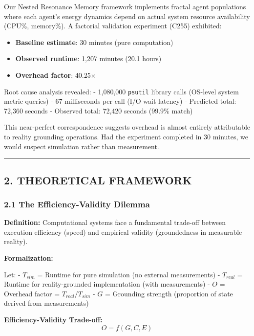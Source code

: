 \documentclass[
]{article}
\providecommand{\tightlist}{%
  \setlength{\itemsep}{0pt}\setlength{\parskip}{0pt}}
\begin{document}
Our Nested Resonance Memory framework implements fractal agent
populations where each agent's energy dynamics depend on actual system
resource availability (CPU\%, memory\%). A factorial validation
experiment (C255) exhibited:

\begin{itemize}
\tightlist
\item
  \textbf{Baseline estimate}: 30 minutes (pure computation)
\item
  \textbf{Observed runtime}: 1,207 minutes (20.1 hours)
\item
  \textbf{Overhead factor}: 40.25×
\end{itemize}

Root cause analysis revealed: - 1,080,000 \texttt{psutil} library calls
(OS-level system metric queries) - 67 milliseconds per call (I/O wait
latency) - Predicted total: 72,360 seconds - Observed total: 72,420
seconds (99.9\% match)

This near-perfect correspondence suggests overhead is almost entirely
attributable to reality grounding operations. Had the experiment
completed in 30 minutes, we would suspect simulation rather than
measurement.

\begin{center}\rule{0.5\linewidth}{0.5pt}\end{center}

\subsection{2. THEORETICAL FRAMEWORK}\label{theoretical-framework}

\subsubsection{2.1 The Efficiency-Validity
Dilemma}\label{the-efficiency-validity-dilemma}

\textbf{Definition:} Computational systems face a fundamental trade-off
between execution efficiency (speed) and empirical validity
(groundedness in measurable reality).

\textbf{Formalization:}

Let: - \(T_{sim}\) = Runtime for pure simulation (no external
measurements) - \(T_{real}\) = Runtime for reality-grounded
implementation (with measurements) - \(O\) = Overhead factor =
\(T_{real} / T_{sim}\) - \(G\) = Grounding strength (proportion of state
derived from measurements)

\textbf{Efficiency-Validity Trade-off:} \[O = f(G, C, E)\]
\end{document}
